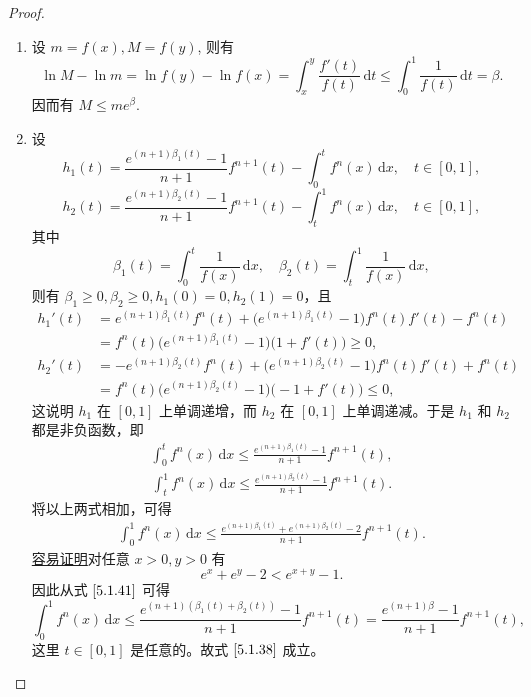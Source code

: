 \documentclass[../../main.tex]{subfiles}%
\begin{document}
\begin{proof}
\begin{enumerate}
\item 设 \( m = f(x), M = f(y) \), 则有  
\[
\ln M - \ln m = \ln f(y) - \ln f(x) = \int_{x}^{y} \frac{f'(t)}{f(t)} \, \mathrm{d}t \leqslant \int_{0}^{1} \frac{1}{f(t)} \, \mathrm{d}t = \beta.
\]  
因而有 \( M \leqslant m e^{\beta} \).

\item 设  
\[
h_1(t) = \frac{e^{(n + 1)\beta_1(t)} - 1}{n + 1} f^{n + 1}(t) - \int_{0}^{t} f^n(x) \, \mathrm{d}x, \quad t \in [0,1],
\]  
\[
h_2(t) = \frac{e^{(n + 1)\beta_2(t)} - 1}{n + 1} f^{n + 1}(t) - \int_{t}^{1} f^n(x) \, \mathrm{d}x, \quad t \in [0,1],
\]  
其中  
\[
\beta_1(t) = \int_{0}^{t} \frac{1}{f(x)} \, \mathrm{d}x, \quad \beta_2(t) = \int_{t}^{1} \frac{1}{f(x)} \, \mathrm{d}x,
\]  
则有 \( \beta_1 \geqslant 0, \beta_2 \geqslant 0, h_1(0) = 0, h_2(1) = 0 \)，且  
\[
\begin{aligned}
h_1'(t) &= e^{(n + 1)\beta_1(t)} f^n(t) + \big( e^{(n + 1)\beta_1(t)} - 1 \big) f^n(t) f'(t) - f^n(t) \\
&= f^n(t) \big( e^{(n + 1)\beta_1(t)} - 1 \big) \big( 1 + f'(t) \big) \geqslant 0,
\end{aligned}
\]  
\[
\begin{aligned}
h_2'(t) &= -e^{(n + 1)\beta_2(t)} f^n(t) + \big( e^{(n + 1)\beta_2(t)} - 1 \big) f^n(t) f'(t) + f^n(t) \\
&= f^n(t) \big( e^{(n + 1)\beta_2(t)} - 1 \big) \big( -1 + f'(t) \big) \leqslant 0,
\end{aligned}
\]  
这说明 \( h_1 \) 在 \([0,1]\) 上单调递增，而 \( h_2 \) 在 \([0,1]\) 上单调递减。于是 \( h_1 \) 和 \( h_2 \) 都是非负函数，即  
\begin{align}
\int_{0}^{t} f^n(x) \, \mathrm{d}x \leqslant \frac{e^{(n + 1)\beta_1(t)} - 1}{n + 1} f^{n + 1}(t), \label{5.1.39}
\end{align}  
\begin{align}
\int_{t}^{1} f^n(x) \, \mathrm{d}x \leqslant \frac{e^{(n + 1)\beta_2(t)} - 1}{n + 1} f^{n + 1}(t). \label{5.1.40}
\end{align}  
将以上两式相加，可得  
\begin{align}
\int_{0}^{1} f^n(x) \, \mathrm{d}x \leqslant \frac{e^{(n + 1)\beta_1(t)} + e^{(n + 1)\beta_2(t)} - 2}{n + 1} f^{n + 1}(t). \label{5.1.41}
\end{align}  
\hyperref[proposition:指数对数函数不等式3]{容易证明}对任意 \( x > 0, y > 0 \) 有  
\[
e^x + e^y - 2 < e^{x + y} - 1.
\]  
因此从式 \(\eqref{5.1.41}\) 可得  
\[
\int_{0}^{1} f^n(x) \, \mathrm{d}x \leqslant \frac{e^{(n + 1)(\beta_1(t) + \beta_2(t))} - 1}{n + 1} f^{n + 1}(t) = \frac{e^{(n + 1)\beta} - 1}{n + 1} f^{n + 1}(t),
\]  
这里 \( t \in [0,1] \) 是任意的。故式 \(\eqref{5.1.38}\) 成立。
\end{enumerate}

\end{proof}
\end{document}
